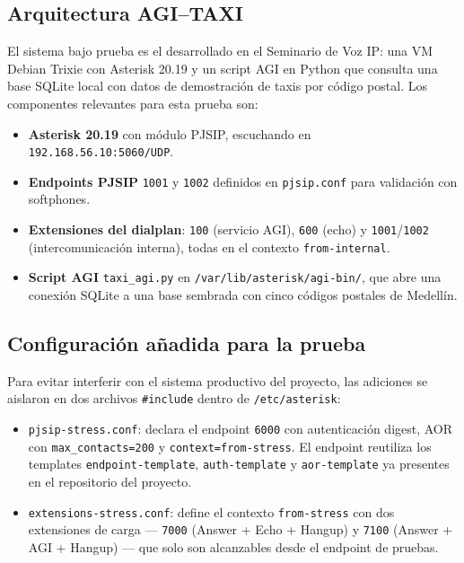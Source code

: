 \documentclass[conference]{IEEEtran}
\begin{document}
\subsection{Arquitectura AGI--TAXI}

El sistema bajo prueba es el desarrollado en el Seminario de Voz IP:
una VM Debian Trixie con Asterisk 20.19 y un script AGI en Python que
consulta una base SQLite local con datos de demostraci\'on de taxis por
c\'odigo postal. Los componentes relevantes para esta prueba son:

\begin{itemize}
    \item \textbf{Asterisk 20.19} con m\'odulo PJSIP, escuchando en
    \texttt{192.168.56.10:5060/UDP}.
    \item \textbf{Endpoints PJSIP} \texttt{1001} y \texttt{1002}
    definidos en \texttt{pjsip.conf} para validaci\'on con softphones.
    \item \textbf{Extensiones del dialplan}: \texttt{100} (servicio
    AGI), \texttt{600} (echo) y \texttt{1001}/\texttt{1002}
    (intercomunicaci\'on interna), todas en el contexto
    \texttt{from-internal}.
    \item \textbf{Script AGI} \texttt{taxi\_agi.py} en
    \texttt{/var/lib/asterisk/agi-bin/}, que abre una conexi\'on
    SQLite a una base sembrada con cinco c\'odigos postales de
    Medell\'in.
\end{itemize}

\subsection{Configuraci\'on a\~nadida para la prueba}

Para evitar interferir con el sistema productivo del proyecto, las
adiciones se aislaron en dos archivos \texttt{\#include} dentro de
\texttt{/etc/asterisk}:

\begin{itemize}
    \item \texttt{pjsip-stress.conf}: declara el endpoint
    \texttt{6000} con autenticaci\'on digest, AOR con
    \texttt{max\_contacts=200} y \texttt{context=from-stress}. El
    endpoint reutiliza los templates \texttt{endpoint-template},
    \texttt{auth-template} y \texttt{aor-template} ya presentes en el
    repositorio del proyecto.
    \item \texttt{extensions-stress.conf}: define el contexto
    \texttt{from-stress} con dos extensiones de carga ---
    \texttt{7000} (Answer + Echo + Hangup) y \texttt{7100} (Answer +
    AGI + Hangup) --- que solo son alcanzables desde el endpoint de
    pruebas.
\end{itemize}
\end{document}

